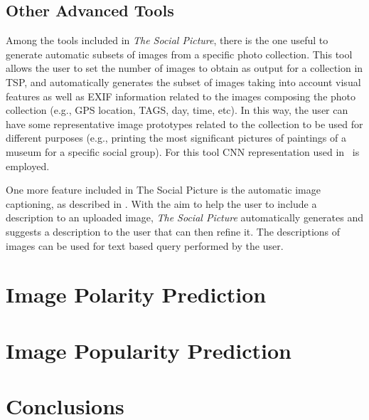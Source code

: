 \subsection{Other Advanced Tools}
%
Among the tools included in \textit{The Social Picture}, there is the one useful to generate automatic subsets of images from a specific photo collection. This tool allows the user to set the number of images to obtain as output for a collection in TSP, and automatically generates the subset of images taking into account visual features as well as EXIF information related to the images composing the photo collection (e.g., GPS location, TAGS, day, time, etc). In this way, the user can have some representative image prototypes related to the collection to be used for different purposes (e.g., printing the most significant pictures of paintings of a museum for a specific social group). For this tool CNN representation used in~\cite{zhou2014learning} is employed.

One more feature included in The Social Picture is the automatic image captioning, as described in \cite{karpathy2015deep}. With the aim to help the user to include a description to an uploaded image, \textit{The Social Picture} automatically generates and suggests a description to the user that can then refine it.  The descriptions of images can be used for text based query performed by the user.


\section{Image Polarity Prediction}

\section{Image Popularity Prediction}

\section{Conclusions}